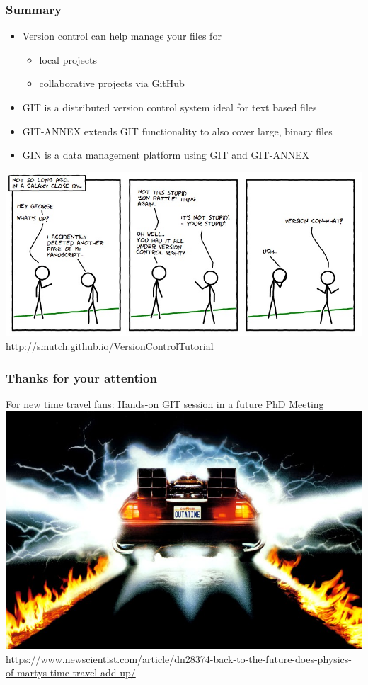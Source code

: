 \documentclass[
t, %
10pt, %
aspectratio=1610, %
ngerman,
english,
]{beamer}
\begin{document}
\begin{frame}
    \frametitle{Summary}
    \begin{itemize}
	\item Version control can help manage your files for
	\begin{itemize}
	    \item local projects
	    \item collaborative projects via GitHub
	\end{itemize}
	\item GIT is a distributed version control system ideal for text based files
	\item GIT-ANNEX extends GIT functionality to also cover large, binary files
	\item GIN is a data management platform using GIT and GIT-ANNEX
    \end{itemize}
    \centering
    \includegraphics[height=0.55\textheight]{graphics/vc-xkcd.jpg}
    \url{http://smutch.github.io/VersionControlTutorial}
\end{frame}


\begin{frame}
    \frametitle{Thanks for your attention}
    For new time travel fans: Hands-on GIT session in a future PhD Meeting
    \centering
    \includegraphics[height=0.7\textheight]{graphics/dn28374-1_800.jpg}\\
    \tiny{\url{https://www.newscientist.com/article/dn28374-back-to-the-future-does-physics-of-martys-time-travel-add-up/}}
\end{frame}
\end{document}
